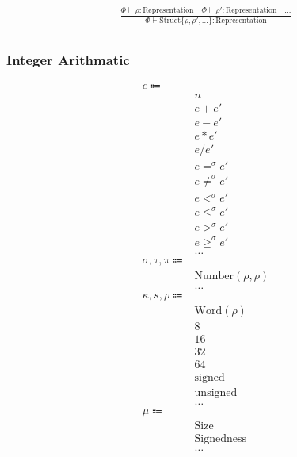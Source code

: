 \documentclass {article}
\begin{document}
\begin{gather*}
\frac
{\Phi \vdash \rho : \text{Representation} \quad \Phi \vdash \rho' : \text{Representation} \quad \dots}
{\Phi \vdash \text{Struct} \{ \rho, \rho', \dots \} : \text{Representation} } \\
\end{gather*}

\subsubsection{Integer Arithmatic}
\begin{align*}
e \Coloneqq & \\
& n \tag{Numeric Literal} \\
& e + e' \tag{Addition} \\
& e - e' \tag{Subtraction} \\
& e * e' \tag{Multiplication} \\
& e / e' \tag{Division} \\
& e =^\sigma e' \tag {Equality} \\
& e \neq^\sigma e' \tag {Inequality} \\
& e <^\sigma e' \tag {Less Then} \\
& e \leq^\sigma e' \tag {Less Then Equal} \\
& e >^\sigma e' \tag {Greater Then} \\
& e \geq^\sigma e' \tag {Greater Then Equal} \\
& \dots \\
\sigma, \tau, \pi \Coloneqq & \\
& \text{Number} (\rho, \rho) \tag{Number} \\
& \dots \\
\kappa, s, \rho \Coloneqq & \\
& \text{Word} (\rho) \tag{Word Representation} \\
& 8 \tag{Byte Size} \\
& 16 \tag{Short Size} \\
& 32 \tag{Int Size} \\
& 64 \tag{Long Size} \\
& \text{signed} \tag{Signed} \\
& \text{unsigned} \tag{Unsigned} \\
& \dots \\
\mu \Coloneqq & \\
& \text{Size} \\
& \text{Signedness} \\
& \dots
\end{align*}
\end{document}

